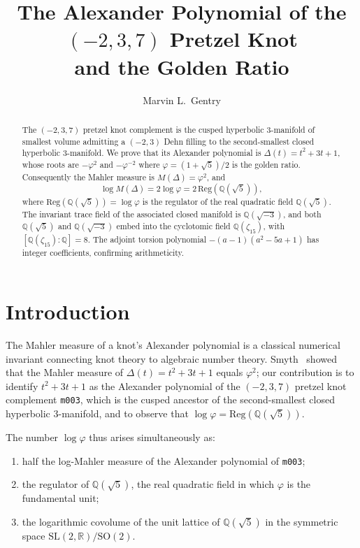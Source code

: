 \documentclass[12pt]{article}
\title{The Alexander Polynomial of the $(-2,3,7)$ Pretzel Knot\\
and the Golden Ratio}
\date{}
\author[1]{Marvin L.\ Gentry}
\affil[1]{Independent Researcher\\
  \texttt{drmlgentry@protonmail.com}\\
  ORCID: 0009-0006-4550-2663}
\theoremstyle{definition}
\theoremstyle{remark}
\newcommand{\Q}{\mathbb{Q}}
\newcommand{\R}{\mathbb{R}}
\newcommand{\vp}{\varphi}
\begin{document}
\maketitle

\begin{abstract}
The $(-2,3,7)$ pretzel knot complement is the cusped hyperbolic
3-manifold of smallest volume admitting a $(-2,3)$ Dehn filling to the
second-smallest closed hyperbolic 3-manifold.  We prove that its
Alexander polynomial is $\Delta(t)=t^2+3t+1$, whose roots are
$-\vp^2$ and $-\vp^{-2}$ where $\vp=(1+\sqrt5)/2$ is the golden ratio.
Consequently the Mahler measure is $M(\Delta)=\vp^2$, and
\[
\log M(\Delta) = 2\log\vp = 2\,\mathrm{Reg}(\Q(\sqrt5)),
\]
where $\mathrm{Reg}(\Q(\sqrt5))=\log\vp$ is the regulator of the real
quadratic field $\Q(\sqrt5)$.  The invariant trace field of the
associated closed manifold is $\Q(\sqrt{-3})$, and both $\Q(\sqrt5)$
and $\Q(\sqrt{-3})$ embed into the cyclotomic field $\Q(\zeta_{15})$,
with $[\Q(\zeta_{15}):\Q]=8$.  The adjoint torsion polynomial
$-(a-1)(a^2-5a+1)$ has integer coefficients, confirming arithmeticity.
\end{abstract}

\section{Introduction}

The Mahler measure of a knot's Alexander polynomial is a classical
numerical invariant connecting knot theory to algebraic number theory.
Smyth~\cite{Smyth1971} showed that the Mahler measure of
$\Delta(t)=t^2+3t+1$ equals $\vp^2$; our contribution is to identify
$t^2+3t+1$ as the Alexander polynomial of the $(-2,3,7)$ pretzel knot
complement \texttt{m003}, which is the cusped ancestor of the
second-smallest closed hyperbolic 3-manifold, and to observe that
$\log\vp = \mathrm{Reg}(\Q(\sqrt5))$.

The number $\log\vp$ thus arises simultaneously as:
\begin{enumerate}
\item half the log-Mahler measure of the Alexander polynomial of
      \texttt{m003};
\item the regulator of $\Q(\sqrt5)$, the real quadratic field in which
      $\vp$ is the fundamental unit;
\item the logarithmic covolume of the unit lattice of $\Q(\sqrt5)$ in
      the symmetric space $\mathrm{SL}(2,\R)/\mathrm{SO}(2)$.
\end{enumerate}
\end{document}
